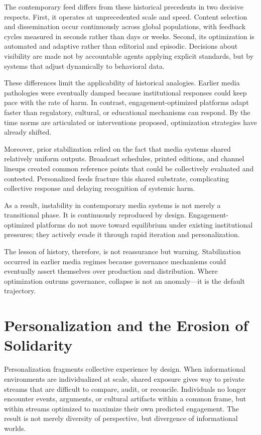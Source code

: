 \documentclass[12pt]{article}
\begin{document}
The contemporary feed differs from these historical precedents in two decisive respects. First, it operates at unprecedented scale and speed. Content selection and dissemination occur continuously across global populations, with feedback cycles measured in seconds rather than days or weeks. Second, its optimization is automated and adaptive rather than editorial and episodic. Decisions about visibility are made not by accountable agents applying explicit standards, but by systems that adjust dynamically to behavioral data.

These differences limit the applicability of historical analogies. Earlier media pathologies were eventually damped because institutional responses could keep pace with the rate of harm. In contrast, engagement-optimized platforms adapt faster than regulatory, cultural, or educational mechanisms can respond. By the time norms are articulated or interventions proposed, optimization strategies have already shifted.

Moreover, prior stabilization relied on the fact that media systems shared relatively uniform outputs. Broadcast schedules, printed editions, and channel lineups created common reference points that could be collectively evaluated and contested. Personalized feeds fracture this shared substrate, complicating collective response and delaying recognition of systemic harm.

As a result, instability in contemporary media systems is not merely a transitional phase. It is continuously reproduced by design. Engagement-optimized platforms do not move toward equilibrium under existing institutional pressures; they actively evade it through rapid iteration and personalization.

The lesson of history, therefore, is not reassurance but warning. Stabilization occurred in earlier media regimes because governance mechanisms could eventually assert themselves over production and distribution. Where optimization outruns governance, collapse is not an anomaly—it is the default trajectory.

\section{Personalization and the Erosion of Solidarity}

Personalization fragments collective experience by design. When informational environments are individualized at scale, shared exposure gives way to private streams that are difficult to compare, audit, or reconcile. Individuals no longer encounter events, arguments, or cultural artifacts within a common frame, but within streams optimized to maximize their own predicted engagement. The result is not merely diversity of perspective, but divergence of informational worlds.
\end{document}
